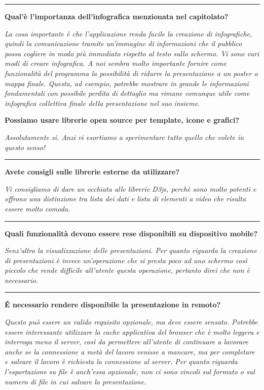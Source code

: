 \hrule
\bigskip
\textbf{Qual'è l'importanza dell'infografica menzionata nel capitolato?}\\
\begin{margini}{0.7cm}{0.7cm}
	\textit{La cosa importante è che l'applicazione renda facile la creazione di infografiche, quindi la comunicazione tramite un'immagine di informazioni che il pubblico possa cogliere in modo più immediato rispetto al testo sullo schermo. Vi sono vari modi di creare infografica. A noi sembra molto importante fornire come funzionalità del programma la possibilità di ridurre la  presentazione a un poster o mappa finale. Questa, ad esempio, potrebbe mostrare in grande le informazioni fondamentali con possibile perdita di dettaglio ma rimane comunque utile come infografica collettiva finale della presentazione nel suo insieme.}\\
\end{margini}
\newpage
\noindent \textbf{Possiamo usare librerie open source per template, icone e grafici?}\\
\begin{margini}{0.7cm}{0.7cm}
	\textit{Assolutamente si. Anzi vi esortiamo a sperimentare tutto quello che volete in questo senso!}\\
\end{margini}
\hrule
\bigskip
\textbf{Avete consigli sulle librerie esterne da utilizzare?}\\
\begin{margini}{0.7cm}{0.7cm}
	\textit{Vi consigliamo di dare un occhiata alle librerie D3js, perchè sono molto potenti e offrono una distinzione tra lista dei dati e lista di elementi a video che risulta essere molto comoda.}\\
\end{margini}
\hrule
\bigskip
\textbf{Quali funzionalità devono essere rese disponibili su dispositivo mobile?}\\
\begin{margini}{0.7cm}{0.7cm}
	\textit{Senz'altro la visualizzazione delle presentazioni. Per quanto riguarda la creazione di presentazioni è invece un'operazione che si presta poco ad uno schermo così piccolo che rende difficile all'utente questa operazione, pertanto direi che non è necessario.}\\
\end{margini}
\hrule
\bigskip
\textbf{É necessario rendere disponibile la presentazione in remoto?}\\
\begin{margini}{0.7cm}{0.7cm}
	\textit{Questo può essere un valido requisito opzionale, ma deve essere sensato. Potrebbe essere interessante utilizzare la cache applicativa del browser che è molto leggera e interroga meno il server, così da permettere all'utente di continuare a lavorare anche se la connessione a metà del lavoro venisse a mancare, ma per completare e salvare il lavoro è richiesta la connessione al server. Per quanto riguarda l'esportazione su file è anch'essa opzionale, non ci sono vincoli sul formato o sul numero di file in cui salvare la presentazione.}\\
\end{margini}
